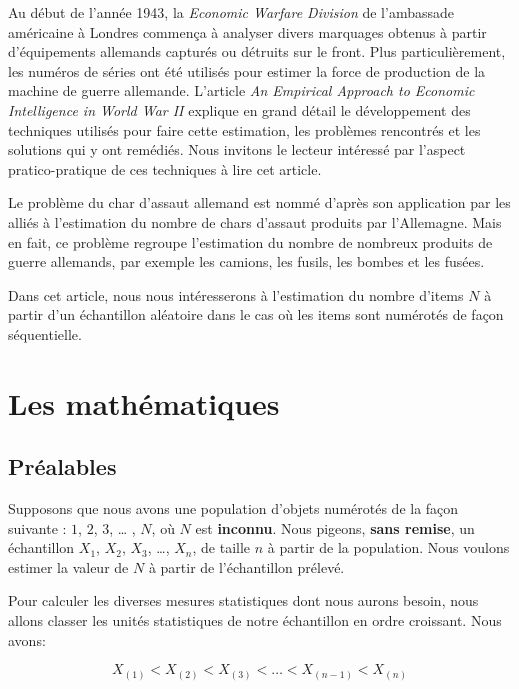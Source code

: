 \documentclass[10pt]{article}
\begin{document}
Au début de l'année 1943, la \emph{Economic Warfare Division} de
l'ambassade américaine à Londres commença à analyser divers marquages
obtenus à partir d'équipements allemands capturés ou détruits sur le
front. Plus particulièrement, les numéros de séries ont été utilisés
pour estimer la force de production de la machine de guerre allemande.
L'article \emph{An Empirical Approach to Economic Intelligence in World
War II} \cite{Ruggles1947} explique en grand détail le développement des
techniques utilisés pour faire cette estimation, les problèmes
rencontrés et les solutions qui y ont remédiés. Nous invitons le lecteur
intéressé par l'aspect pratico-pratique de ces techniques à lire cet
article.

Le problème du char d'assaut allemand est nommé d'après son application
par les alliés à l'estimation du nombre de chars d'assaut produits par
l'Allemagne. Mais en fait, ce problème regroupe l'estimation du nombre
de nombreux produits de guerre allemands, par exemple les camions, les
fusils, les bombes et les fusées.

Dans cet article, nous nous intéresserons à l'estimation du nombre
d'items \(N\) à partir d'un échantillon aléatoire dans le cas où les
items sont numérotés de façon séquentielle.

\hypertarget{les-mathematiques}{%
\section{\texorpdfstring{Les mathématiques
\label{maths}}{Les mathématiques }}\label{les-mathematiques}}

\hypertarget{prealables}{%
\subsection{Préalables}\label{prealables}}

Supposons que nous avons une population d'objets numérotés de la façon
suivante : \(1\), \(2\), \(3\), \ldots{} , \(N\), où \(N\) est
\textbf{inconnu}. Nous pigeons, \textbf{\textbf{sans remise}}, un
échantillon \(X_1\), \(X_2\), \(X_3\), \ldots{}, \(X_n\), de taille
\(n\) à partir de la population. Nous voulons estimer la valeur de \(N\)
à partir de l'échantillon prélevé.

Pour calculer les diverses mesures statistiques dont nous aurons besoin,
nous allons classer les unités statistiques de notre échantillon en
ordre croissant. Nous avons:

\[X_{(1)} <  X_{(2)} < X_{(3)} < \ldots < X_{(n-1)} < X_{(n)}\]
\end{document}

